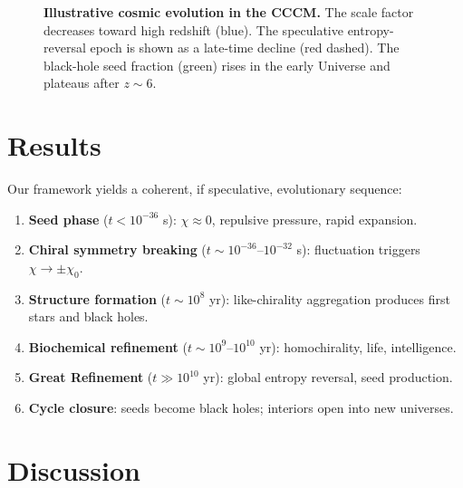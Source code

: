 \documentclass[a4paper,11pt]{article}
\newcommand{\CCCM}{CCCM}
\begin{document}
\begin{figure}[htbp]
\centering
{}
\caption{\textbf{Illustrative cosmic evolution in the \CCCM.} The scale factor decreases toward high redshift (blue). The speculative entropy-reversal epoch is shown as a late-time decline (red dashed). The black-hole seed fraction (green) rises in the early Universe and plateaus after $z \sim 6$.}
\label{fig:evolution}
\end{figure}

\section{Results}
\label{sec:results}

Our framework yields a coherent, if speculative, evolutionary sequence:
\begin{enumerate}[label=(\arabic*)]
    \item \textbf{Seed phase} ($t < 10^{-36}$ s): $\chi \approx 0$, repulsive pressure, rapid expansion.
    \item \textbf{Chiral symmetry breaking} ($t \sim 10^{-36}$--$10^{-32}$ s): fluctuation triggers $\chi \to \pm \chi_0$.
    \item \textbf{Structure formation} ($t \sim 10^8$ yr): like-chirality aggregation produces first stars and black holes.
    \item \textbf{Biochemical refinement} ($t \sim 10^9$--$10^{10}$ yr): homochirality, life, intelligence.
    \item \textbf{Great Refinement} ($t \gg 10^{10}$ yr): global entropy reversal, seed production.
    \item \textbf{Cycle closure}: seeds become black holes; interiors open into new universes.
\end{enumerate}

\section{Discussion}
\label{sec:discussion}
\end{document}
